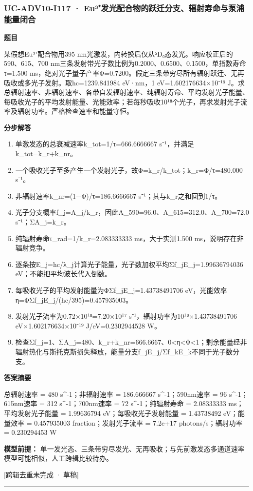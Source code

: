 \documentclass[UTF8,11pt,a4paper]{ctexart}
\begin{document}
\subsubsection*{UC-ADV10-I117 · Eu³⁺发光配合物的跃迁分支、辐射寿命与泵浦能量闭合}
\noindent\textbf{题目}\par
某假想Eu³⁺配合物用395 nm光激发，内转换后仅从⁵D₀态发光。响应校正后的590、615、700 nm三条发射带光子数比例为0.2000、0.6500、0.1500，单指数寿命τ=1.500 ms，绝对光子量子产率Φ=0.7200。假定三条带穷尽所有辐射跃迁、无再吸收或多光子发射。取hc=1239.841984 eV·nm，1 eV=1.602176634×10⁻¹⁹ J。求总辐射速率、非辐射速率、各带自发辐射速率、纯辐射寿命、平均发射光子能量、每吸收光子的平均发射能量、光能效率；若每秒吸收10¹⁸个光子，再求发射光子流率及辐射功率。严格检查速率和能量守恒。\par
\medskip\noindent\textbf{分步解答}
\begin{enumerate}
\item 单激发态的总衰减速率k\_tot=1/τ=666.6666667 s⁻¹，并满足k\_tot=k\_r+k\_nr。
\item 一个吸收光子至多产生一个发射光子，故Φ=k\_r/k\_tot；k\_r=Φ/τ=480.000 s⁻¹。
\item 非辐射速率k\_nr=(1−Φ)/τ=186.6666667 s⁻¹；其与k\_r之和回到1/τ。
\item 光子分支概率f\_j=A\_j/k\_r，因此A\_590=96.0、A\_615=312.0、A\_700=72.0 s⁻¹；ΣA\_j=k\_r。
\item 纯辐射寿命τ\_rad=1/k\_r=2.083333333 ms，大于实测1.500 ms，说明存在非辐射竞争。
\item 逐条按E\_j=hc/λ\_j计算光子能量，光子数加权平均Σf\_jE\_j=1.99636794036 eV；不能把平均波长代入倒数。
\item 每吸收光子的平均发射能量为ΦΣf\_jE\_j=1.43738491706 eV，光能效率η=ΦΣf\_jE\_j/(hc/395)=0.457935003。
\item 发射光子流率为0.72×10¹⁸=7.20×10¹⁷ s⁻¹，辐射功率为10¹⁸×1.43738491706 eV×1.602176634×10⁻¹⁹ J/eV=0.2302944528 W。
\item 检查Σf\_j=1、ΣA\_j=480、k\_r+k\_nr=666.6667、0<η<Φ<1；剩余能量经非辐射热化与斯托克斯损失释放，能量分支f\_jE\_j/Σf\_kE\_k不同于光子数分支。
\end{enumerate}
\noindent\textbf{答案摘要}\par
总辐射速率 = 480 s\textasciicircum{}-1；非辐射速率 = 186.666667 s\textasciicircum{}-1；590nm速率 = 96 s\textasciicircum{}-1；615nm速率 = 312 s\textasciicircum{}-1；700nm速率 = 72 s\textasciicircum{}-1；纯辐射寿命 = 2.08333333 ms；平均发射光子能量 = 1.99636794 eV；每吸收光子发射能量 = 1.43738492 eV；能量效率 = 0.457935003 fraction；发射光子流率 = 7.2e+17 photons/s；辐射功率 = 0.230294453 W\par
\noindent\textbf{模型前提：}
单一发光态、三条带穷尽发光、无再吸收；与先前激发态多通道速率模型可能相似，人工跨辑比较待办。\par
\noindent\textcolor{red!65!black}{[跨辑去重未完成 · 草稿]} \par
\medskip\hrule\medskip
{}
\end{document}
